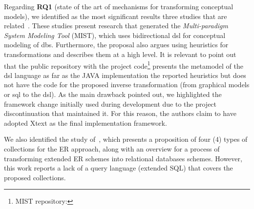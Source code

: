 Regarding \textbf{RQ1} (state of the art of mechanisms for transforming conceptual models), we identified as the most significant results three studies that are related~\cite{Ristic:2016, Dimitrieski:2015, Dimitrieski:2014}.
These studies present research that generated the \textit{Multi-paradigm System Modeling Tool} (MIST), which uses bidirectional \ac{dsl} for conceptual modeling of \acp{db}.
Furthermore, the proposal also argues using heuristics for transformations and describes them at a high level.
It is relevant to point out that the public repository with the project code\footnote{MIST repository: } presents the metamodel of the \ac{dsl} language as far as the JAVA implementation the reported heuristics but does not have the code for the proposed inverse transformation (from graphical models or \ac{sql} to the \ac{dsl}).
As the main drawback pointed out, we highlighted the framework change initially used during development due to the project discontinuation that maintained it.
For this reason, the authors claim to have adopted Xtext as the final implementation framework.

We also identified the study of~\cite{Hartmann:2007}, which presents a proposition of four (4) types of collections for the ER approach, along with an overview for a process of
transforming extended ER schemes into relational databases schemes.
However, this work reports a lack of a query language (extended SQL) that covers the proposed collections.

